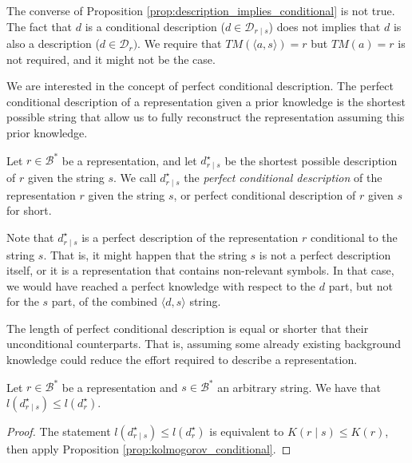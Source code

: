 The converse of Proposition \ref{prop:description_implies_conditional} is not true. The fact that $d$ is a conditional description ($d \in \mathcal{D}_{r \mid s}$) does not implies that $d$ is also a description ($d \in \mathcal{D}_{r})$. We require that $TM \left(\langle a, s \rangle \right) = r$ but $TM \left( a \right) = r$ is not required, and it might not be the case.

We are interested in the concept of perfect conditional description. The perfect conditional description of a representation given a prior knowledge is the shortest possible string that allow us to fully reconstruct the representation assuming this prior knowledge.

\begin{definition}
Let $r \in \mathcal{B}^\ast$ be a representation, and let $d^\star_{r \mid s}$ be the shortest possible description of $r$ given the string $s$. We call $d^\star_{r \mid s}$ the \emph{perfect conditional description} of the representation $r$ given the string $s$, or perfect conditional description of $r$ given $s$ for short.
\end{definition}

Note that $d^\star_{r \mid s}$ is a perfect description of the representation $r$ conditional to the string $s$. That is, it might happen that the string $s$ is not a perfect description itself, or it is a representation that contains non-relevant symbols. In that case, we would have reached a perfect knowledge with respect to the $d$ part, but not for the $s$ part, of the combined $\langle d, s \rangle$ string.

The length of perfect conditional description is equal or shorter that their unconditional counterparts. That is, assuming some already existing background knowledge could reduce the effort required to describe a representation.

\begin{proposition}
\label{prop:description_conditional_inequality}
Let $r \in \mathcal{B}^\ast$ be a representation and $s \in \mathcal{B}^\ast$ an arbitrary string. We have that $l \left( d^\star_{r \mid s} \right) \leq l \left( d^\star_r \right)$.
\end{proposition}
\begin{proof}
The statement $l \left( d^\star_{r \mid s} \right) \leq l \left( d^\star_r \right)$ is equivalent to $K(r \mid s) \leq K(r)$, then apply Proposition \ref{prop:kolmogorov_conditional}.
\end{proof}

